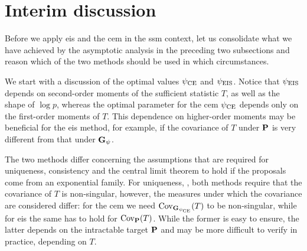 \section{Interim discussion}
\label{sec:interim-discussion}

Before we apply \acrshort{eis} and the \acrshort{cem} in the \acrshort{ssm} context, let us consolidate what we have achieved by the asymptotic analysis in the preceding two subsections and reason which of the two methods should be used in which circumstances.

We start with a discussion of the optimal values $\pce$ and $\peis$.
Notice that $\peis$ depends on second-order moments of the sufficient statistic $T$, as well as the shape of $\log p$, whereas the optimal parameter for the \gls{cem} $\pce$ depends only on the first-order moments of $T$. 
This dependence on higher-order moments may be beneficial for the \acrshort{eis} method, for example, if the covariance of $T$ under $\P$ is very different from that under $\G_{\psi}$. 


The two methods differ concerning the assumptions that are required for uniqueness, consistency and the central limit theorem to hold if the proposals come from an exponential family. 
For uniqueness, , both methods require that the covariance of $T$ is non-singular, however, the measures under which the covariance are considered differ: for the \acrshort{cem} we need $\cov_{\G_{\pce}} (T)$ to be non-singular, while for \acrshort{eis} the same has to hold for $\cov_{\P} (T)$. While the former is easy to ensure, the latter depends on the intractable target $\P$ and may be more difficult to verify in practice, depending on $T$. 

